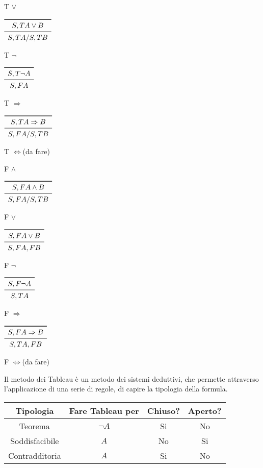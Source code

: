 T $\lor$

$\begin{array}{c}
\toprule
S,T A \lor B \\
\midrule
S, TA/ S, TB \\
\end{array}$

T $\neg$

$\begin{array}{c}
\toprule
S,T \neg A \\
\midrule
S, FA \\
\end{array}$

T $\Rightarrow$

$\begin{array}{c}
\toprule
S,T A \Rightarrow B \\
\midrule
S, FA / S, TB \\
\end{array}$

T $\iff$(da fare)

F $\land$

$\begin{array}{c}
\toprule
S,F A \land B \\
\midrule
S, FA/ S, TB \\
\end{array}$

F $\lor$

$\begin{array}{c}
\toprule
S,F A \lor B \\
\midrule
S, FA, FB \\
\end{array}$

F $\neg$

$\begin{array}{c}
\toprule
S,F \neg A \\
\midrule
S, TA \\
\end{array}$

F $\Rightarrow$

$\begin{array}{c}
\toprule
S,F A \Rightarrow B \\
\midrule
S, TA, FB \\
\end{array}$

F $\iff$(da fare)

Il metodo dei Tableau è un metodo dei sistemi deduttivi, che permette attraverso
l'applicazione di una serie di regole, di capire la tipologia della formula.
\begin{tabular}{cccc}
\toprule Tipologia & Fare Tableau per & Chiuso? & Aperto? \\
\midrule
         Teorema & $\neg A$ & Si & No \\
         Soddisfacibile & $A$ & No & Si \\
         Contradditoria & $A$ & Si & No \\
\bottomrule
\end{tabular}

